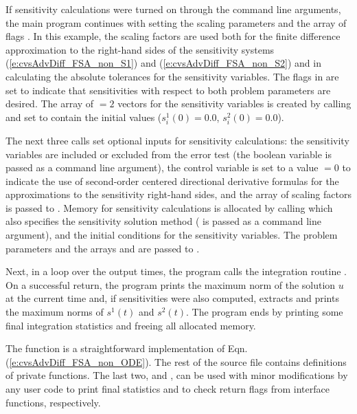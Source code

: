 If sensitivity calculations were turned on through the command line arguments,
the main program continues with setting the scaling parameters
 and the array of flags . In this example,
the scaling factors  are used both for the finite difference approximation
to the right-hand sides of the sensitivity systems (\ref{e:cvsAdvDiff_FSA_non_S1}) 
and (\ref{e:cvsAdvDiff_FSA_non_S2}) and in calculating the absolute tolerances for the 
sensitivity variables. 
The flags in  are set to indicate that sensitivities with respect to both 
problem parameters are desired.
The array of  $=2$ vectors  for the sensitivity variables is created
by calling  and set to contain the initial values
($s^1_i(0) = 0.0$, $s^2_i(0) = 0.0$).

The next three calls set optional inputs for sensitivity calculations: the sensitivity
variables are included or excluded from the error test (the boolean variable 
is passed as a command line argument), the control variable  is set to a value
 $=0$ to indicate  the use of second-order centered directional derivative
formulas for the approximations to the sensitivity right-hand sides, and the array of
scaling factors  is passed to {\cvodes}.
Memory for sensitivity calculations is allocated by calling 
which also specifies the sensitivity solution method ( is passed
as a command line argument), and the initial conditions for the sensitivity variables.
The problem parameters  and the arrays  and  are
passed to .

Next, in a loop over the  output times, the program calls the integration
routine . On a successful return, the program prints the maximum norm
of the solution $u$ at the current time and, if sensitivities were also computed, 
extracts and prints the maximum norms of $s^1(t)$ and $s^2(t)$.
The program ends by printing some final integration statistics and freeing all
allocated memory.

The  function is a straightforward implementation of Eqn.
(\ref{e:cvsAdvDiff_FSA_non_ODE}).  The rest of the source file
contains definitions of private functions.  The last
two,  and , can be used with minor
modifications by any {\cvodes} user code to print final {\cvodes}
statistics and to check return flags from {\cvodes} interface
functions, respectively.

